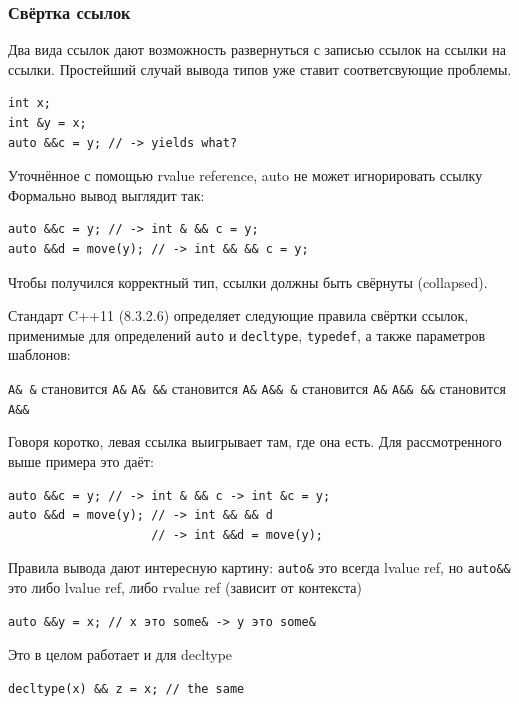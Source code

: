 \documentclass[a4paper,12pt,oneside]{article}
\begin{document}
\subsubsection{Свёртка ссылок}\label{subsub:collapse}

Два вида ссылок дают возможность развернуться с записью ссылок на ссылки на ссылки. Простейший случай вывода типов уже ставит соответсвующие проблемы.

\begin{lstlisting}
int x;
int &y = x;
auto &&c = y; // -> yields what?
\end{lstlisting}

Уточнённое с помощью rvalue reference, auto не может игнорировать ссылку
Формально вывод выглядит так:

\begin{lstlisting}
auto &&c = y; // -> int & && c = y;
auto &&d = move(y); // -> int && && c = y;
\end{lstlisting}

Чтобы получился корректный тип, ссылки должны быть свёрнуты (collapsed).

Стандарт C++11 (8.3.2.6) определяет следующие правила свёртки ссылок, применимые для определений \lstinline!auto! и \lstinline!decltype!, \lstinline!typedef!, а также параметров шаблонов:

\lstinline!A& &! становится \lstinline!A&!
\lstinline!A& &&! становится \lstinline!A&!
\lstinline!A&& &! становится \lstinline!A&!
\lstinline!A&& &&! становится \lstinline!A&&!

Говоря коротко, левая ссылка выигрывает там, где она есть. Для рассмотренного выше примера это даёт:

\begin{lstlisting}
auto &&c = y; // -> int & && c -> int &c = y;
auto &&d = move(y); // -> int && && d 
                    // -> int &&d = move(y);
\end{lstlisting}

Правила вывода дают интересную картину: \lstinline!auto&! это всегда lvalue ref, но \lstinline!auto&&! это либо lvalue ref, либо rvalue ref (зависит от контекста)

\begin{lstlisting}
auto &&y = x; // x это some& -> y это some&
\end{lstlisting}

Это в целом работает и для decltype

\begin{lstlisting}
decltype(x) && z = x; // the same
\end{lstlisting}
\end{document}
